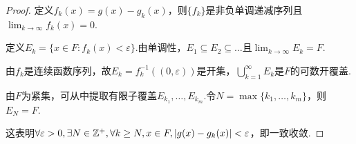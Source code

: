 \begin{proof}
    定义\(f_k(x)=g(x)-g_k(x)\)，则\(\{f_k\}\)是{\kaishu 非负单调递减序列}且\(\lim_{k \to \infty}f_k(x)=0\).

    定义\(E_k=\{x \in F: f_k(x)<\varepsilon\}\).由单调性，\(E_1 \subseteq E_2 \subseteq \dots\)且\(\lim_{k \to \infty}E_k=F\).

    由\({f_k}\)是连续函数序列，故\(E_k=f_k^{-1}((0,\varepsilon))\)是开集，\(\bigcup_{k=1}^\infty E_k\)是\(F\)的可数开覆盖.

    由\(F\)为紧集，可从中提取有限子覆盖\(E_{k_1}, \dots, E_{k_m}\).令\(N=\max\{k_1, \dots, k_m\}\)，则\(E_N=F\).

    这表明\(\forall \varepsilon>0, \exists N \in \mathbb{Z}^+, \forall k \geq N, x \in F, \abs*{g(x)-g_k(x)}<\varepsilon\)，即一致收敛.
\end{proof}

\begin{comment}
    \begin{proof}
        充分性：由\cref{2.E.4}相同的{\kaishu 误差分配}方法可得.

        必要性：令\(B(a,\delta)=(a-\delta, a+\delta)\).先证\(\forall a \in F, \exists \delta_a>0, g_1, g_2, \dots\)在\(B(a,\delta_a)\)上一致收敛至\(f\).

        由\(g_1, g_2, \dots\)逐点收敛得\(\forall \varepsilon>0, \exists n_a \in \mathbb{Z}^+, \abs*{g_{n_a}(a)-g(a)}<\varepsilon/3\).

        由\(g_{n_a}\)的连续性得\(\forall \varepsilon>0, \exists \delta_{a,1}>0, \forall x \in B(a,\delta_{a,1}), \abs*{g_{n_a}(x)-g_{n_a}(a)}<\varepsilon/3\).

        由\(g\)的连续性得\(\forall \varepsilon>0, \exists \delta_{a,2}>0, \forall x \in B(a,\delta_{a,2}), \abs*{g(x)-g(a)}<\varepsilon/3\).

        取\(\delta_a=\min\{\delta_{a,1}, \delta_{a_2}\}\).\(\forall \varepsilon>0, \exists \delta_a>0, n_a \in \mathbb{Z}^+, \forall x \in B(a,\delta_a), k \geq n_a,\)
        \begin{align*}
            \abs*{g_k(x)-g(x)} &\leq \abs*{g_{n_a}(x)-g(x)}
            \leq \abs*{g_{n_a}(x)-g_{n_a}(a)}+\abs*{g_{n_a}(a)-g(a)}+\abs*{g(x)-g(a)} \\
            &< \varepsilon/3+\varepsilon/3+\varepsilon/3=\varepsilon
        \end{align*}
        第一步据\(g_1, g_2, \dots\)的单调性成立.因此\(g_1, g_2, \dots\)在\(B(a,\delta_a)\)上一致收敛.

        由于\(F\)是紧集，故有一个有限子覆盖\(\bigcup_{i=1}^m B(a_i, \delta_{a_i})\)，\(g_1, g_2, \dots\)在\(B(a_i,\delta_{a_i})\)上一致收敛.

        取\(n=\max\{n_{a_1}, \dots, n_{a_m}\}\).\(\forall x \in F, \exists n \in \mathbb{Z}^+, \forall k \geq n, \abs*{g_k(x)-g(x)} \leq \abs*{g_n(a_i)-g(a_i)}<\varepsilon\).

        {\kaishu 这题的重点是利用单调性和连续性让序列在各邻域内各自一致收敛，随后利用紧集性质确保有限邻域覆盖，从而实际上转化为有限定义域下的逐点收敛和一致收敛等价.}
    \end{proof}
\end{comment}

